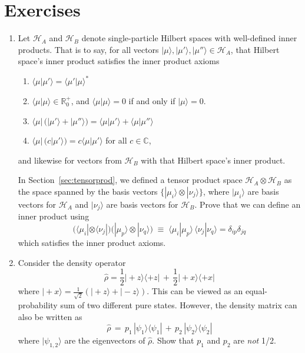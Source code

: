 \documentclass[pra,12pt]{revtex4}
\begin{document}
\section*{Exercises}

\begin{enumerate}
\item Let $\mathscr{H}_A$ and $\mathscr{H}_B$ denote single-particle
  Hilbert spaces with well-defined inner products.  That is to say,
  for all vectors $|\mu\rangle, |\mu'\rangle, |\mu''\rangle \in
  \mathscr{H}_A$, that Hilbert space's inner product satisfies the
  inner product axioms
  \begin{enumerate}
  \item $\langle \mu|\mu' \rangle = \langle\mu'|\mu\rangle^*$
  \item $\langle \mu|\mu \rangle \in \mathbb{R}^+_0$, and $\langle \mu|\mu \rangle = 0$ if and only if $|\mu\rangle = 0$.
  \item $\langle\mu| \, \big(|\mu'\rangle + |\mu'' \rangle\big)
    = \langle \mu|\mu'\rangle + \langle \mu|\mu''\rangle$
  \item $\langle \mu | \,\big(c|\mu'\rangle\big) = c\langle\mu|\mu'\rangle$ for all $c\in\mathbb{C}$,
  \end{enumerate}
  and likewise for vectors from $\mathscr{H}_B$ with that Hilbert
  space's inner product.

  In Section~\ref{sec:tensorprod}, we defined a tensor product space
  $\mathscr{H}_A\otimes\mathscr{H}_B$ as the space spanned by the
  basis vectors $\{|\mu_i\rangle\otimes|\nu_j\rangle\}$, where
  $|\mu_i\rangle$ are basis vectors for $\mathscr{H}_A$ and
  $|\nu_j\rangle$ are basis vectors for $\mathscr{H}_B$.  Prove that
  we can define an inner product using
  \begin{equation}
    \Big(\langle\mu_i| \otimes \langle\nu_j| \Big) \Big(|\mu_p\rangle \otimes |\nu_q\rangle\Big) \;\equiv\; \langle\mu_i|\mu_p\rangle \, \langle\nu_j|\nu_q\rangle = \delta_{ip}\delta_{jq}
  \end{equation}
  which satisfies the inner product axioms.
  \label{ex:innerprod}

\item Consider the density operator
  \begin{equation}
    \hat{\rho} = \frac{1}{2} |\!+\!z\rangle \langle+z|
    \,+\, \frac{1}{2} |\!+\!x\rangle \langle+x|
  \end{equation}
  where $|\!+\!x\rangle = \frac{1}{\sqrt{2}} \left(|\!+\!z\rangle +
  |\!-\!z\rangle\right)$.  This can be viewed as an equal-probability
  sum of two different pure states.  However, the density matrix can
  also be written as
  \begin{equation}
    \hat{\rho} \,=\, p_1\, |\psi_1\rangle \langle \psi_1|
    \,+\, p_2\, |\psi_2\rangle \langle\psi_2|
  \end{equation}
  where $|\psi_{1,2}\rangle$ are the eigenvectors of $\hat{\rho}$.
  Show that $p_1$ and $p_2$ are \textit{not} 1/2.
  \label{ex:rho_decomp}



\end{enumerate}
\end{document}
